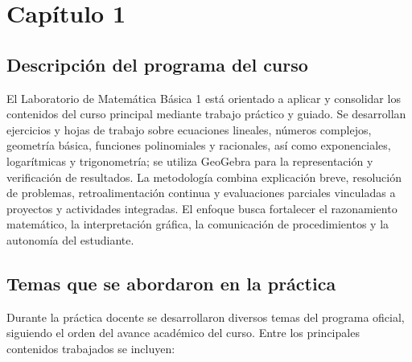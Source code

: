 \documentclass[12pt]{article}
\let\oldsection\section
\renewcommand{\section}{\clearpage\oldsection}
\begin{document}
	
	
	
	
	\section{Capítulo 1}
	
	\subsection{Descripción del programa del curso}
	
	El Laboratorio de Matemática Básica 1 está orientado a aplicar y consolidar los contenidos del curso principal mediante trabajo práctico y guiado. Se desarrollan ejercicios y hojas de trabajo sobre ecuaciones lineales, números complejos, geometría básica, funciones polinomiales y racionales, así como exponenciales, logarítmicas y trigonometría; se utiliza GeoGebra para la representación y verificación de resultados. La metodología combina explicación breve, resolución de problemas, retroalimentación continua y evaluaciones parciales vinculadas a proyectos y actividades integradas. El enfoque busca fortalecer el razonamiento matemático, la interpretación gráfica, la comunicación de procedimientos y la autonomía del estudiante.
	
	
	
	\subsection{Temas que se abordaron en la práctica}
	
	Durante la práctica docente se desarrollaron diversos temas del programa oficial, siguiendo el orden del avance académico del curso. Entre los principales contenidos trabajados se incluyen:
	
\end{document}
